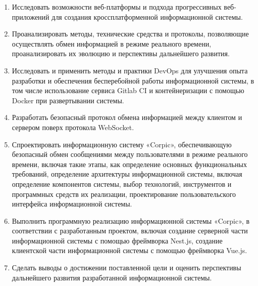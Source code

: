 \begin{enumerate} 
  \item Исследовать возможности веб-платформы и подхода прогрессивных веб-приложений для создания кроссплатформенной информационной системы.
  
  \item Проанализировать методы, технические средства и протоколы, позволяющие осуществлять обмен информацией в режиме реального времени, проанализировать их эволюцию и перспективы дальнейшего развития.
  
  \item Исследовать и применить методы и практики DevOps для улучшения опыта разработки и обеспечения бесперебойной работы информационной системы, в том числе использование сервиса Gitlab CI и контейнеризации с помощью Docker при развертывании системы.

  \item Разработать безопасный протокол обмена информацией между клиентом и сервером поверх протокола WebSocket.

  \item Спроектировать информационную систему «Corpic», обеспечивающую безопасный обмен сообщениями между пользователями в режиме реального времени, включая такие этапы, как определение основных функциональных требований, определение архитектуры информационной системы, включая определение компонентов системы, выбор технологий, инструментов и программных средств их реализации, проектирование пользовательского интерфейса информационной системы.

  \item Выполнить программную реализацию информационной системы «Corpic», в соответствии с разработанным проектом, включая создание серверной части информационной системы с помощью фреймворка Nest.js, создание клиентской части информационной системы с помощью фреймворка Vue.js.

  \item Сделать выводы о достижении поставленной цели и оценить перспективы дальнейшего развития разработанной информационной системы.
\end{enumerate}